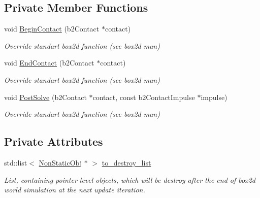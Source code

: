\subsection*{Private Member Functions}
\begin{DoxyCompactItemize}
\item 
\mbox{\label{class_my_contact_listener_abad225bec15c17598d20da175c169495}} 
void \hyperlink{class_my_contact_listener_abad225bec15c17598d20da175c169495}{Begin\+Contact} (b2\+Contact $\ast$contact)
\begin{DoxyCompactList}\small\item\em Override standart box2d function (see box2d man) \end{DoxyCompactList}\item 
\mbox{\label{class_my_contact_listener_aa28063f833c2bf6162b044c03474436d}} 
void \hyperlink{class_my_contact_listener_aa28063f833c2bf6162b044c03474436d}{End\+Contact} (b2\+Contact $\ast$contact)
\begin{DoxyCompactList}\small\item\em Override standart box2d function (see box2d man) \end{DoxyCompactList}\item 
\mbox{\label{class_my_contact_listener_a691495aee67681d73d94c91e7c7a4df6}} 
void \hyperlink{class_my_contact_listener_a691495aee67681d73d94c91e7c7a4df6}{Post\+Solve} (b2\+Contact $\ast$contact, const b2\+Contact\+Impulse $\ast$impulse)
\begin{DoxyCompactList}\small\item\em Override standart box2d function (see box2d man) \end{DoxyCompactList}\end{DoxyCompactItemize}
\subsection*{Private Attributes}
\begin{DoxyCompactItemize}
\item 
\mbox{\label{class_my_contact_listener_a41da507e8c150d1898d73172e4e3f916}} 
std\+::list$<$ \hyperlink{class_non_static_obj}{Non\+Static\+Obj} $\ast$ $>$ \hyperlink{class_my_contact_listener_a41da507e8c150d1898d73172e4e3f916}{to\+\_\+destroy\+\_\+list}
\begin{DoxyCompactList}\small\item\em List, containing pointer level objects, which will be destroy after the end of box2d world simulation at the next update iteration. \end{DoxyCompactList}\end{DoxyCompactItemize}


